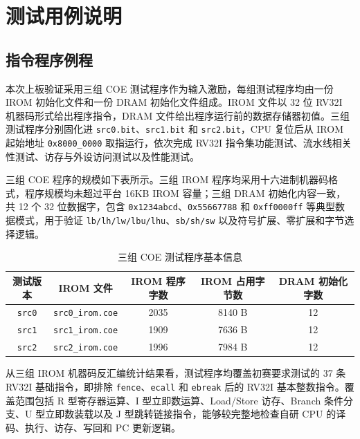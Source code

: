 \documentclass[12pt,a4paper]{ctexart}
\newcommand{\code}[1]{\texttt{#1}}
\begin{document}
\section{测试用例说明}

\subsection{指令程序例程}

本次上板验证采用三组 COE 测试程序作为输入激励，每组测试程序均由一份 IROM 初始化文件和一份 DRAM 初始化文件组成。IROM 文件以 32 位 RV32I 机器码形式给出程序指令，DRAM 文件给出程序运行前的数据存储器初值。三组测试程序分别固化进 \code{src0.bit}、\code{src1.bit} 和 \code{src2.bit}，CPU 复位后从 IROM 起始地址 \code{0x8000\_0000} 取指运行，依次完成 RV32I 指令集功能测试、流水线相关性测试、访存与外设访问测试以及性能测试。

三组 COE 程序的规模如下表所示。三组 IROM 程序均采用十六进制机器码格式，程序规模均未超过平台 16KB IROM 容量；三组 DRAM 初始化内容一致，共 12 个 32 位数据字，包含 \code{0x1234abcd}、\code{0x55667788} 和 \code{0xff0000ff} 等典型数据模式，用于验证 \code{lb/lh/lw/lbu/lhu}、\code{sb/sh/sw} 以及符号扩展、零扩展和字节选择逻辑。

\begin{table}[H]
	\centering
	\caption{三组 COE 测试程序基本信息}
	\begin{tabular}{c|c|c|c|c}
		\hline
		测试版本        & IROM 文件             & IROM 程序字数 & IROM 占用字节数 & DRAM 初始化字数 \\
		\hline
		\code{src0} & \code{src0\_irom.coe} & 2035      & 8140 B     & 12         \\
		\code{src1} & \code{src1\_irom.coe} & 1909      & 7636 B     & 12         \\
		\code{src2} & \code{src2\_irom.coe} & 1996      & 7984 B     & 12         \\
		\hline
	\end{tabular}
\end{table}

从三组 IROM 机器码反汇编统计结果看，测试程序均覆盖初赛要求测试的 37 条 RV32I 基础指令，即排除 \code{fence}、\code{ecall} 和 \code{ebreak} 后的 RV32I 基本整数指令。覆盖范围包括 R 型寄存器运算、I 型立即数运算、Load/Store 访存、Branch 条件分支、U 型立即数装载以及 J 型跳转链接指令，能够较完整地检查自研 CPU 的译码、执行、访存、写回和 PC 更新逻辑。
\end{document}
